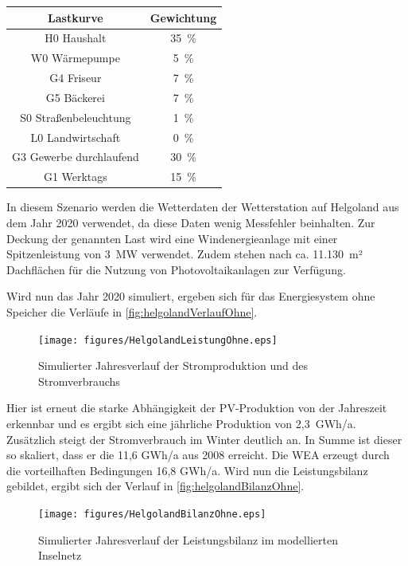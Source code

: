 \begin{center}
	\begin{tabular}[htpb]{c|c}
		\textbf{Lastkurve} & \textbf{Gewichtung} \\
		\hline
		H0 Haushalt & 35~\% \\
		W0 Wärmepumpe & 5~\% \\
		G4 Friseur & 7~\% \\
		G5 Bäckerei & 7~\% \\
		S0 Straßenbeleuchtung & 1~\% \\
		L0 Landwirtschaft & 0~\% \\
		G3 Gewerbe durchlaufend & 30~\% \\
		G1 Werktags & 15~\% 
	\end{tabular}
\end{center}

In diesem Szenario werden die Wetterdaten der Wetterstation auf Helgoland aus dem Jahr 2020 verwendet, da diese Daten wenig Messfehler beinhalten. Zur Deckung der genannten Last wird eine Windenergieanlage mit einer Spitzenleistung von 3~MW verwendet. Zudem stehen nach \cite{Helgoland} ca. 11.130~m² Dachflächen für die Nutzung von Photovoltaikanlagen zur Verfügung. 

Wird nun das Jahr 2020 simuliert, ergeben sich für das Energiesystem ohne Speicher die Verläufe in \autoref{fig:helgolandVerlaufOhne}.

\begin{figure}[H]
	\centering
	\texttt{[image: figures/HelgolandLeistungOhne.eps]}
	\caption{Simulierter Jahresverlauf der Stromproduktion und des Stromverbrauchs}
	\label{fig:helgolandVerlaufOhne}
\end{figure}

Hier ist erneut die starke Abhängigkeit der PV-Produktion von der Jahreszeit erkennbar und es ergibt sich eine jährliche Produktion von 2,3~GWh/a. Zusätzlich steigt der Stromverbrauch im Winter deutlich an. In Summe ist dieser so skaliert, dass er die 11,6 GWh/a aus 2008 erreicht. Die WEA erzeugt durch die vorteilhaften Bedingungen 16,8 GWh/a. Wird nun die Leistungsbilanz gebildet, ergibt sich der Verlauf in \autoref{fig:helgolandBilanzOhne}.

\begin{figure}[H]
	\centering
	\texttt{[image: figures/HelgolandBilanzOhne.eps]}
	\caption{Simulierter Jahresverlauf der Leistungsbilanz im modellierten Inselnetz}
	\label{fig:helgolandBilanzOhne}
\end{figure}

